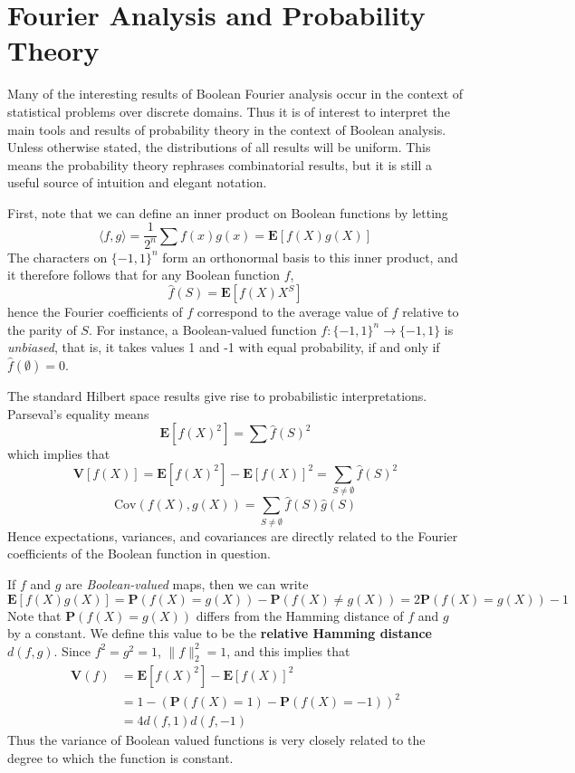 \section{Fourier Analysis and Probability Theory}

Many of the interesting results of Boolean Fourier analysis occur in the context of statistical problems over discrete domains. Thus it is of interest to interpret the main tools and results of probability theory in the context of Boolean analysis. Unless otherwise stated, the distributions of all results will be uniform. This means the probability theory rephrases combinatorial results, but it is still a useful source of intuition and elegant notation.

First, note that we can define an inner product on Boolean functions by letting
%
\[ \langle f, g \rangle = \frac{1}{2^n} \sum f(x)g(x) = \mathbf{E}[f(X)g(X)] \]
%
The characters on $\{ -1, 1 \}^n$ form an orthonormal basis to this inner product, and it therefore follows that for any Boolean function $f$,
%
\[ \widehat{f}(S) = \mathbf{E}[f(X)X^S] \]
%
hence the Fourier coefficients of $f$ correspond to the average value of $f$ relative to the parity of $S$. For instance, a Boolean-valued function $f: \{ -1, 1 \}^n \to \{ -1, 1 \}$ is {\it unbiased}, that is, it takes values 1 and -1 with equal probability, if and only if $\widehat{f}(\emptyset) = 0$.

The standard Hilbert space results give rise to probabilistic interpretations. Parseval's equality means
%
\[ \mathbf{E}[f(X)^2] = \sum \widehat{f}(S)^2 \]
%
which implies that
%
\[ \mathbf{V}[f(X)] = \mathbf{E}[f(X)^2] - \mathbf{E}[f(X)]^2 = \sum_{S \neq \emptyset} \widehat{f}(S)^2 \]
%
\[ \text{Cov}(f(X),g(X)) = \sum_{S \neq \emptyset} \widehat{f}(S) \widehat{g}(S) \]
%
Hence expectations, variances, and covariances are directly related to the Fourier coefficients of the Boolean function in question.

If $f$ and $g$ are {\it Boolean-valued} maps, then we can write
%
\[ \mathbf{E}[f(X)g(X)] = \mathbf{P}(f(X) = g(X)) - \mathbf{P}(f(X) \neq g(X)) = 2\mathbf{P}(f(X) = g(X)) - 1 \]
%
Note that $\mathbf{P}(f(X) = g(X))$ differs from the Hamming distance of $f$ and $g$ by a constant. We define this value to be the {\bf relative Hamming distance} $d(f,g)$. Since $f^2 = g^2 = 1$, $\| f \|_2^2 = 1$, and this implies that
%
\begin{align*}
    \mathbf{V}(f) &= \mathbf{E}[f(X)^2] - \mathbf{E}[f(X)]^2\\
    &= 1 - (\mathbf{P}(f(X) = 1) - \mathbf{P}(f(X) = -1))^2\\
    &= 4d(f,1)d(f,-1)
\end{align*}
%
Thus the variance of Boolean valued functions is very closely related to the degree to which the function is constant.

